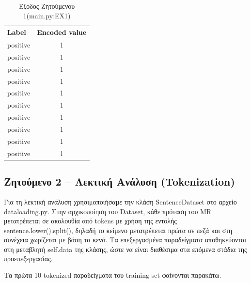 \documentclass[11pt,a4paper]{article}
\begin{document}
\begin{table}[H]
  \centering
  \caption{Έξοδος Ζητούμενου 1\textlatin{(main.py:EX1)}}
  \begin{tabular}{lc}
    \toprule
    \textbf{\textlatin{Label}} & \textbf{\textlatin{Encoded value}} \\
    \midrule
    \textlatin{positive} & 1 \\
    \textlatin{positive} & 1 \\
    \textlatin{positive} & 1 \\
    \textlatin{positive} & 1 \\
    \textlatin{positive} & 1 \\
    \textlatin{positive} & 1 \\
    \textlatin{positive} & 1 \\
    \textlatin{positive} & 1 \\
    \textlatin{positive} & 1 \\
    \textlatin{positive} & 1 \\
    \bottomrule
  \end{tabular}
\end{table}

\subsection*{Ζητούμενο 2 -- Λεκτική Ανάλυση (\foreignlanguage{english}{Tokenization})}

Για τη λεκτική ανάλυση χρησιμοποιήσαμε την κλάση \textlatin{SentenceDataset} στο αρχείο \textlatin{dataloading.py}. 
Στην αρχικοποίηση του \textlatin{Dataset}, κάθε πρόταση του \textlatin{MR} μετατρέπεται σε ακολουθία από \textlatin{tokens} με χρήση 
της εντολής \textlatin{sentence.lower().split()}, δηλαδή το κείμενο μετατρέπεται πρώτα σε πεζά και στη συνέχεια χωρίζεται με βάση τα κενά. 
Τα επεξεργασμένα παραδείγματα αποθηκεύονται στη μεταβλητή \textlatin{self.data} της κλάσης, ώστε να είναι διαθέσιμα στα επόμενα στάδια της 
προεπεξεργασίας.

Τα πρώτα 10 \textlatin{tokenized} παραδείγματα του \textlatin{training set} φαίνονται παρακάτω.
\end{document}
